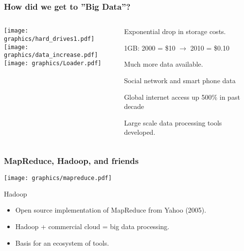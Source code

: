 \begin{frame}
\frametitle{How did we get to ''Big Data''?}

\begin{center}

\begin{columns}

\begin{column}{0.5\textwidth}
\begin{center}
\texttt{[image: graphics/hard\_drives1.pdf]}\\
\bigskip
\bigskip
\texttt{[image: graphics/data\_increase.pdf]}\\
\bigskip
\bigskip
\texttt{[image: graphics/Loader.pdf]}
\end{center}
\end{column}

\begin{column}{0.5\textwidth}
Exponential drop in storage costs.\\
\begin{itemize}
    \tiny{\item 1GB: 2000 = \$10 $\to$ 2010 = \$0.10}
\end{itemize}
\bigskip
\bigskip


Much more data available.\\
\begin{itemize}
    \tiny{\item Social network and smart phone data}
    \item \tiny{Global internet access up 500\% in past decade}
\end{itemize}
\bigskip
\bigskip
\bigskip

Large scale data processing tools developed.
\end{column}

\end{columns}

\end{center}

\end{frame}


\begin{frame}
\frametitle{MapReduce, Hadoop, and friends}
\begin{center}
\texttt{[image: graphics/mapreduce.pdf]}

\pause

\begin{block}{Hadoop}
\begin{itemize}
	\item Open source implementation of MapReduce from Yahoo (2005).
	\item Hadoop + commercial cloud = big data processing.
	\item Basis for an ecosystem of tools.
\end{itemize}
\end{block}
\end{center}
\end{frame}

